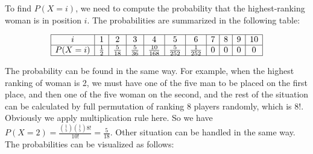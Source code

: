 \begin{solution}
To find \(P(X = i)\), we need to compute the probability that the highest-ranking woman is in position \(i\). The probabilities are summarized in the following table:

\begin{center}
\[
\begin{array}{|c|c|c|c|c|c|c|c|c|c|c|}
\hline
i & 1 & 2 & 3 & 4 & 5 & 6 & 7 & 8 & 9 & 10 \\
\hline
P(X = i) & \frac{1}{2} & \frac{5}{18} & \frac{5}{36} & \frac{10}{168} & \frac{5}{252} & \frac{1}{252} & 0 & 0 & 0 & 0 \\
\hline
\end{array}
\]
\end{center}
The probability can be found in the same way. For example, when the highest ranking of woman is 2, we must have one of the five man to be placed on the first place, and then one of the five woman on the second, and the rest of the situation can be calculated by full permutation of ranking 8 players randomly, which is $8!$. Obviously we apply multiplication rule here. So we have \(P(X=2) = \frac{\binom{1}{5}\binom{1}{5}8!}{10!} = \frac{5}{18}.\) Other situation can be handled in the same way.
The probabilities can be visualized as follows:
\begin{center}
\probtable

\end{center}

\end{solution}


